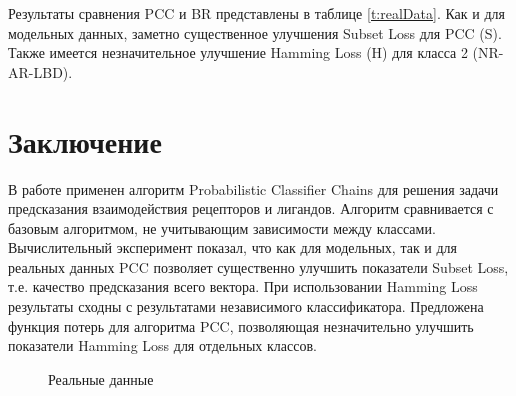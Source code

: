 \documentclass{ITaSconf}
\begin{document}

Результаты сравнения PCC и BR представлены в таблице \ref{t:realData}. Как и для модельных данных, заметно существенное улучшения Subset Loss для PCC (S). Также имеется незначительное улучшение Hamming Loss (H) для класса 2 (NR-AR-LBD).

\section{Заключение}

В работе применен алгоритм Probabilistic Classifier Chains для решения задачи предсказания взаимодействия рецепторов и лигандов. Алгоритм сравнивается с базовым алгоритмом, не учитывающим зависимости между классами. Вычислительный эксперимент показал, что как для модельных, так и для реальных данных PCC позволяет существенно улучшить показатели Subset Loss, т.е. качество предсказания всего вектора. При использовании Hamming Loss результаты сходны с результатами независимого классификатора. Предложена функция потерь для алгоритма PCC, позволяющая незначительно улучшить показатели Hamming Loss для отдельных классов.

\begin{figure}[h]
	\caption{Реальные данные}
	\label{fg:VIF}
\end{figure}
\end{document}
